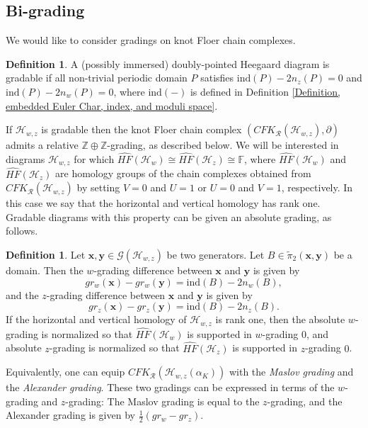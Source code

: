 \documentclass{amsart}
\theoremstyle{definition}
\newtheorem{defn}[thm]{Definition}
\theoremstyle{remark}
\numberwithin{equation}{section}
\numberwithin{equation}{section} \makeatletter
\begin{document}
\subsection{Bi-grading}
We would like to consider gradings on knot Floer chain complexes. 


\begin{defn}\label{Definition, gradable doubly-pointed diagram}
A (possibly immersed) doubly-pointed Heegaard diagram is gradable if all non-trivial periodic domain $P$ satisfies $\text{ind}(P)-2n_z(P)=0$ and $\text{ind}(P)-2n_w(P)=0$, where $\text{ind}(-)$ is defined in Definition \ref{Definition, embedded Euler Char, index, and moduli space}. 
\end{defn}

If $\mathcal{H}_{w,z}$ is gradable then the knot Floer chain complex $(CFK_\mathcal{R}(\mathcal{H}_{w,z}),\partial)$ admits a relative $\mathbb{Z}\oplus\mathbb{Z}$-grading, as described below. We will be interested in diagrams  $\mathcal{H}_{w,z}$  for which $\widehat{HF}(\mathcal{H}_{w})\cong \widehat{HF}(\mathcal{H}_{z})\cong \mathbb{F}$, where $\widehat{HF}(\mathcal{H}_{w})$ and $\widehat{HF}(\mathcal{H}_{z})$ are homology groups of the chain complexes obtained from $CFK_\mathcal{R}(\mathcal{H}_{w,z})$ by setting $V=0$ and $U=1$ or $U=0$ and $V=1$, respectively. In this case we say that the horizontal and vertical homology has rank one. Gradable diagrams with this property can be given an absolute grading, as follows.


\begin{defn}\label{Definition, w- and z- gradings}
	Let $\bm{x},\bm{y}\in \mathcal{G}(\mathcal{H}_{w,z})$ be two generators. Let $B\in \tilde{\pi}_2(\bm{x},\bm{y})$ be a domain. Then the $w$-grading difference between $\bm{x}$ and $\bm{y}$ is given by $$gr_w(\bm{x})-gr_w(\bm{y})=\text{ind}(B)-2n_w(B),$$ and
	the $z$-grading difference between $\bm{x}$ and $\bm{y}$ is given by $$gr_z(\bm{x})-gr_z(\bm{y})=\text{ind}(B)-2n_z(B).$$
	If the horizontal and vertical homology of $\mathcal{H}_{w,z}$ is rank one, then the absolute $w$-grading is normalized so that $\widehat{HF}(\mathcal{H}_{w})$ is supported in $w$-grading $0$, and absolute $z$-grading is normalized so that $\widehat{HF}(\mathcal{H}_{z})$ is supported in $z$-grading $0$.
\end{defn}
Equivalently, one can equip $CFK_{\mathcal{R}}(\mathcal{H}_{w,z}(\alpha_{K}))$ with the \textit{Maslov grading} and the \textit{Alexander grading}. These two gradings can be expressed in terms of the $w$-grading and $z$-grading: The Maslov grading is equal to the $z$-grading, and the Alexander grading is given by $\frac{1}{2}(gr_w-gr_z)$.  
\end{document}
